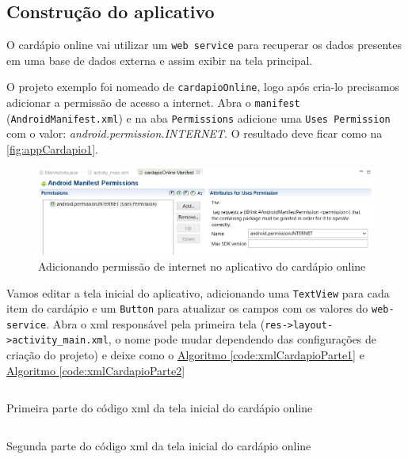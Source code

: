 \documentclass[a4paper,12pt,brazil,oneside]{book}
\begin{document}
\subsection{Construção do aplicativo}

O cardápio online vai utilizar um \texttt{web service} para recuperar os dados presentes em uma base de dados externa e assim exibir na tela principal.

O projeto exemplo foi nomeado de \texttt{cardapioOnline}, logo após cria-lo precisamos adicionar a permissão de acesso a internet. Abra o \texttt{manifest} (\texttt{AndroidManifest.xml}) e na aba \texttt{Permissions} adicione uma \texttt{Uses Permission} com o valor: \emph{android.permission.INTERNET}. O resultado deve ficar como na \autoref{fig:appCardapio1}.

\begin{figure}[H]
  \centering
  \includegraphics[width=1\textwidth]{figuras/devapp/cardapio/APP_Cardapio1.png}
  \caption{Adicionando permissão de internet no aplicativo do cardápio online}
  \label{fig:appCardapio1}
\end{figure}

Vamos editar a tela inicial do aplicativo, adicionando uma \texttt{TextView} para cada item do cardápio e um \texttt{Button} para atualizar os campos com os valores do \texttt{web-service}. Abra o xml responsável pela primeira tela (\texttt{res->layout->activity\_main.xml}, o nome pode mudar dependendo das configurações de criação do projeto) e deixe como o \hyperref[code:xmlCardapioParte1]{Algoritmo \ref*{code:xmlCardapioParte1}} e \hyperref[code:xmlCardapioParte2]{Algoritmo \ref*{code:xmlCardapioParte2}}

\begin{listing}[H]
	\inputminted[linenos=true,fontsize=\small,frame=lines, framesep=2mm, tabsize=2,numbersep=5pt]{xml}{src/devapp/cardapio/activity_mainParte1.xml}
	\caption{Primeira parte do código xml da tela inicial do cardápio online}
	\label{code:xmlCardapioParte1}
	\end{listing}
	
\begin{listing}[H]
	\inputminted[linenos=true,fontsize=\small,frame=lines, framesep=2mm, tabsize=2,numbersep=5pt]{xml}{src/devapp/cardapio/activity_mainParte2.xml}
	\caption{Segunda parte do código xml da tela inicial do cardápio online}
	\label{code:xmlCardapioParte2}
	\end{listing}
\end{document}
